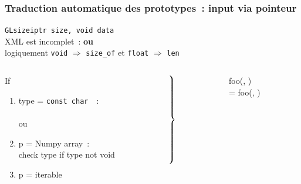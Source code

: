 \begin{frame}
  \frametitle{Traduction automatique des prototypes~: input via pointeur}
  \texttt{GLsizeiptr size,  void  data} \\[.5em]
  \attention{} \alert{XML est incomplet~:  \textbf{ou} } \\
  logiquement \texttt{void} $\Longrightarrow$ \texttt{size\_of} et \texttt{float} $\Longrightarrow$ \texttt{len} \\[1em]
  \begin{columns}
    \begin{column}[c]{.4\textwidth}
      If
      \begin{enumerate}
      \item type = \texttt{const char \ptr\ptr}~:\\
         \\ ou 
      \item p = Numpy array~:\\
        check type if type not void \\
      \item p = iterable \\
      \end{enumerate}
    \end{column}
    \begin{column}[c]{1em}
      $\left.\rule{0pt}{2cm}\right\}$
    \end{column}
    \begin{column}[c]{.5\textwidth}
       foo(, ) \\
       = foo(, )
    \end{column}
  \end{columns}
  \note{
    \begin{enumerate}
    \item 
    \end{enumerate}
  }
\end{frame}

